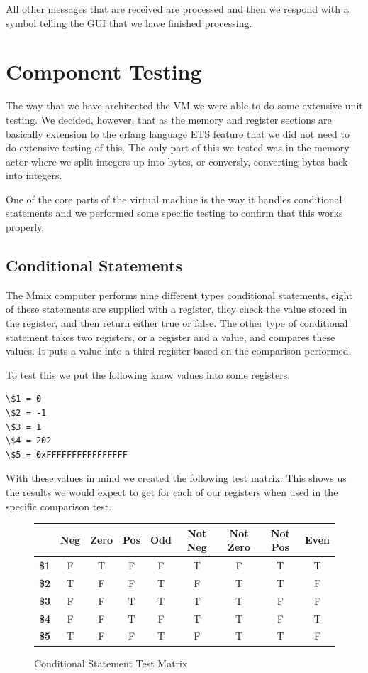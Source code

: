 \documentclass[a4paper,11pt]{report}
\begin{document}
All other messages that are received are processed and then we respond with a symbol telling the GUI that we have finished processing.
\section{Component Testing}
The way that we have architected the VM we were able to do some extensive unit testing. We decided, however, that as the memory and register sections are basically extension to the erlang language ETS feature that we did not need to do extensive testing of this. The only part of this we tested was in the memory actor where we split integers up into bytes, or conversly, converting bytes back into integers.

One of the core parts of the virtual machine is the way it handles conditional statements and we performed some specific testing to confirm that this works properly.
\subsection{Conditional Statements}
The Mmix computer performs nine different types conditional statements, eight of these statements are supplied with a register, they check the value stored in the register, and then return either true or false. The other type of conditional statement takes two registers, or a register and a value, and compares these values. It puts a value into a third register based on the comparison performed.

To test this we put the following know values into some registers.

\begin{lstlisting}
\$1 = 0
\$2 = -1
\$3 = 1
\$4 = 202
\$5 = 0xFFFFFFFFFFFFFFFF
\end{lstlisting}

With these values in mind we created the following test matrix. This shows us the results we would expect to get for each of our registers when used in the specific comparison test.
\begin{figure}[ht!]
\begin{center}
\begin{tabular}{| l | c | c  | c | c  | c | c  | c | c  |}
\hline
 & \textbf{Neg} & \textbf{Zero} & \textbf{Pos} & \textbf{Odd} & \textbf{Not Neg} & \textbf{Not Zero} & \textbf{Not Pos} & \textbf{Even}\\ \hline
\textbf{\$1} & F & T & F & F & T & F & T & T\\ \hline
\textbf{\$2} & T & F & F & T & F & T & T & F\\ \hline
\textbf{\$3} & F & F & T & T & T & T & F & F\\ \hline
\textbf{\$4} & F & F & T & F & T & T & F & T\\ \hline
\textbf{\$5} & T & F & F & T & F & T & T & F\\ \hline
\end{tabular}
\end{center}
\caption{Conditional Statement Test Matrix}
\end{figure}
\end{document}
